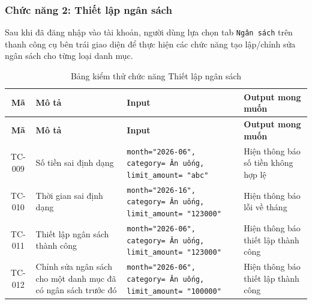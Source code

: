 \documentclass[12pt,letterpaper]{article}
\begin{document}
\subsubsection{Chức năng 2: Thiết lập ngân sách}

Sau khi đã đăng nhập vào tài khoản, người dùng lựa chọn tab \texttt{Ngân sách} trên thanh công cụ bên trái giao diện để thực hiện các chức năng tạo lập/chỉnh sửa ngân sách cho từng loại danh mục.

\begin{xltabular}{\textwidth}{|c|p{3.5cm}|X|p{3.5cm}|}
    \hline
    \centering\textbf{Mã} & \centering\textbf{Mô tả} & \centering\textbf{Input} & \centering\arraybackslash\textbf{Output mong muốn} \\
    \hline
    \endfirsthead
    \hline
    \centering\textbf{Mã} & \centering\textbf{Mô tả} & \centering\textbf{Input} & \centering\arraybackslash\textbf{Output mong muốn} \\
    \hline
    \endhead
    \endfoot
    \hline
    \caption{Bảng kiểm thử chức năng Thiết lập ngân sách}
    \label{tab:testcase_auth}
    \endlastfoot
    TC-009& Số tiền sai định dạng & \texttt{month="2026-06", category= Ăn uống, limit\_amount= "abc"} & Hiện thông báo số tiền không hợp lệ \\
    \hline
    TC-010 & Thời gian sai định dạng & \texttt{month="2026-16", category= Ăn uống, limit\_amount= "123000"} & Hiện thông báo lỗi về tháng \\
    \hline
    TC-011 & Thiết lập ngân sách thành công & \texttt{month="2026-06", category= Ăn uống, limit\_amount= "123000"} & Hiện thông báo thiết lập thành công \\
    \hline
    TC-012 & Chỉnh sửa ngân sách cho một danh mục đã có ngân sách trước đó & \texttt{month="2026-06", category= Ăn uống, limit\_amount= "100000"} & Hiện thông báo thiết lập thành công \\
    \hline
\end{xltabular}
\end{document}
